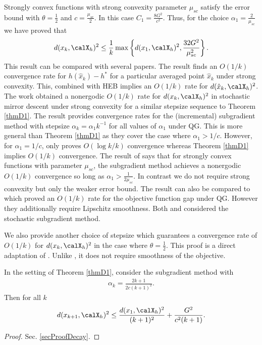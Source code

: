 Strongly convex functions with strong convexity parameter $\mu_{sc}$ satisfy the error bound with $\theta=\frac{1}{2}$ and $c=\frac{\mu_{sc}}{2}$. In this case $C_1=\frac{8 G^2}{c^2}$. Thus, for the choice $\alpha_1=\frac{2}{\mu_{sc}}$ we have proved that
\begin{eqnarray*}
d(x_k,\calX_h)^2\leq \frac{1}{k}\max\left\{d(x_1,\calX_h)^2,\frac{32 G^2}{\mu_{sc}^2}\right\}.
\end{eqnarray*}
This result can be compared with several papers. The result \cite[Theorem 6.2]{bubeck2015convex} finds an $O(1/k)$ convergence rate for $h(\hat{x}_k)-h^*$ for a particular averaged point $\hat{x}_k$ under strong convexity. This, combined with HEB implies an $O(1/k)$ rate for $d(\hat{x}_k,\calX_h)^2$.  The work \cite[Thm 1]{nedic2014stochastic} obtained a nonergodic $O(1/k)$ rate for $d(x_k,\calX_h)^2$ in stochastic mirror descent under strong convexity for a similar stepsize sequence to Theorem \ref{thmD1}. The result \cite[Prop. 2.8]{nedic2001convergence} provides convergence rates for the (incremental) subgradient method with stepsize $\alpha_k=\alpha_1k^{-1}$ for all values of $\alpha_1$ under QG. This is more general than Theorem \ref{thmD1} as they cover the case where $\alpha_1>1/c$. However, for $\alpha_1=1/c$, \cite[Prop. 2.8]{nedic2001convergence} only proves $O(\log k/k)$ convergence whereas Theorem \ref{thmD1} implies $O(1/k)$ convergence. 
The result of \cite[Eq. (2.9)]{nemirovski2009robust} says that for strongly convex functions with parameter $\mu_{sc}$, the subgradient method achieves a nonergodic $O(1/k)$ convergence so long as $\alpha_1>\frac{1}{2\mu_{sc}}$.  In contrast we do not require strong convexity but only the weaker error bound. The result can also be compared to \cite[Thm. 4]{karimi2016linear} which proved an $O(1/k)$ rate for the objective function gap under QG. However they additionally require Lipschitz smoothness. Both \cite{nemirovski2009robust} and \cite{karimi2016linear} considered the stochastic subgradient method. 

We also provide another choice of stepsize which guarantees a convergence rate of $O(1/k)$ for $d(x_k,\calX_h)^2$ in the case where $\theta=\frac{1}{2}$. This proof is a direct adaptation of \cite[Thm. 4]{karimi2016linear}. Unlike \cite[Thm. 4]{karimi2016linear}, it does not require smoothness of the objective.
\begin{proposition}\label{PropThta05}
In the setting of Theorem \ref{thmD1}, consider the subgradient method with 
\begin{eqnarray*}
\alpha_k =\frac{2k+1}{2c(k+1)^2}.
\end{eqnarray*}
Then for all $k$
\begin{eqnarray*}
d(x_{k+1},\calX_h)^2 
\leq
\frac{d(x_1,\calX_h)^2}{(k+1)^2}
+
\frac{G^2}{c^2(k+1)}.
\end{eqnarray*}
\end{proposition}
\begin{proof}
Sec. \ref{secProofDecay}.
\end{proof}